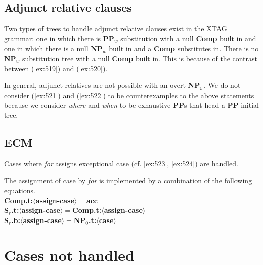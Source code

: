 \subsection{Adjunct relative clauses} 
Two types of trees to handle adjunct relative clauses exist in the 
XTAG grammar: one in which there is {\bf PP$_{w}$} substitution with 
a null {\bf Comp} built in and one in which there is a null {\bf NP$_{w}$} 
built in and a {\bf Comp} substitutes in. There is no {\bf NP$_{w}$} 
substitution tree with a null {\bf Comp} built in. This is because of 
the contrast between (\ref{ex:519}) and (\ref{ex:520}). 
\beginsentences
{}\label{ex:519} 
\label{ex:520} 
\endsentences

In general, adjunct relatives are not possible with an overt {\bf NP$_{w}$}. 
We do not consider (\ref{ex:521}) and (\ref{ex:522}) to be counterexamples to 
the above statements because we consider {\em where} and {\em when} 
to be exhaustive {\bf PP}s that head a {\bf PP} initial tree. 
 
\beginsentences
{}\label{ex:521} 
\label{ex:522} 
\endsentences

 
\subsection{ECM} 
Cases where {\em for} assigns exceptional case (cf. \ref{ex:523}, \ref{ex:524}) are handled. 
 
\beginsentences
{}\label{ex:523} 
\label{ex:524} 
\endsentences

 
The assignment of case by {\em for} is implemented by a combination of the 
following equations.\\ 
{\bf Comp.t:$\langle$assign-case$\rangle =$acc}\\ 
{\bf S$_{r}$.t:$\langle$assign-case$\rangle =$Comp.t:$\langle$assign-case$\rangle$}\\ 
{\bf S$_{r}$.b:$\langle$assign-case$\rangle =$NP$_{0}$.t:$\langle$case$\rangle$} 
 
\section{Cases not handled} 
